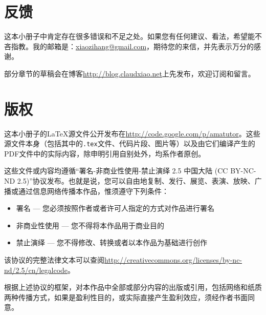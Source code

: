 \section*{反馈}
这本小册子中肯定存在很多错误和不足之处。如果您有任何建议、看法，希望能不吝指教。我的邮箱是：\href{mailto:xiaozihang@gmail.com}{xiaozihang@gmail.com}，期待您的来信，并先表示万分的感谢。

部分章节的草稿会在博客\url{http://blog.claudxiao.net}上先发布，欢迎订阅和留言。

\section*{版权}
这本小册子的{\LaTeX}源文件公开发布在\url{http://code.google.com/p/amatutor}。这些源文件本身（包括其中的\lstinline!.tex!文件、代码片段、图片等）以及由它们编译产生的PDF文件中的实际内容，除申明引用自别处外，均系作者原创。

这些文件或内容均遵循“署名-非商业性使用-禁止演绎 2.5 中国大陆 (CC BY-NC-ND 2.5)”协议发布。也就是说，您可以自由地复制、发行、展览、表演、放映、广播或通过信息网络传播本作品，惟须遵守下列条件：

\begin{itemize}
  \item 署名 — 您必须按照作者或者许可人指定的方式对作品进行署名
  \item 非商业性使用 — 您不得将本作品用于商业目的
  \item 禁止演绎 — 您不得修改、转换或者以本作品为基础进行创作
\end{itemize}

该协议的完整法律文本可以查阅\url{http://creativecommons.org/licenses/by-nc-nd/2.5/cn/legalcode}。

根据上述协议的框架，对本作品中全部或部分内容的出版或引用，包括网络和纸质两种传播方式，如果是盈利性目的，或实际直接产生盈利效应，须经作者书面同意。

